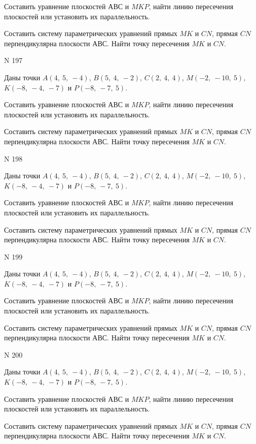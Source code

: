 \documentclass[11pt]{report}
\begin{document}
Составить уравнение плоскостей $АВС$ и $MKP$,
найти линию пересечения плоскостей или установить их параллельность.

Составить систему параметрических уравнений прямых $MK$ и $CN$,
прямая $CN$ перпендикулярна плоскости $АВС$. 
Найти точку пересечения $MK$ и $CN$.



 N 197

Даны точки $A\left( 4, \  5, \  -4\right)$, $B\left( 5, \  4, \  -2\right)$, $C\left( 2, \  4, \  4\right)$, $M\left( -2, \  -10, \  5\right)$, $K\left( -8, \  -4, \  -7\right)$ и $P\left( -8, \  -7, \  5\right)$.


Составить уравнение плоскостей $АВС$ и $MKP$,
найти линию пересечения плоскостей или установить их параллельность.

Составить систему параметрических уравнений прямых $MK$ и $CN$,
прямая $CN$ перпендикулярна плоскости $АВС$. 
Найти точку пересечения $MK$ и $CN$.



 N 198

Даны точки $A\left( 4, \  5, \  -4\right)$, $B\left( 5, \  4, \  -2\right)$, $C\left( 2, \  4, \  4\right)$, $M\left( -2, \  -10, \  5\right)$, $K\left( -8, \  -4, \  -7\right)$ и $P\left( -8, \  -7, \  5\right)$.


Составить уравнение плоскостей $АВС$ и $MKP$,
найти линию пересечения плоскостей или установить их параллельность.

Составить систему параметрических уравнений прямых $MK$ и $CN$,
прямая $CN$ перпендикулярна плоскости $АВС$. 
Найти точку пересечения $MK$ и $CN$.



 N 199

Даны точки $A\left( 4, \  5, \  -4\right)$, $B\left( 5, \  4, \  -2\right)$, $C\left( 2, \  4, \  4\right)$, $M\left( -2, \  -10, \  5\right)$, $K\left( -8, \  -4, \  -7\right)$ и $P\left( -8, \  -7, \  5\right)$.


Составить уравнение плоскостей $АВС$ и $MKP$,
найти линию пересечения плоскостей или установить их параллельность.

Составить систему параметрических уравнений прямых $MK$ и $CN$,
прямая $CN$ перпендикулярна плоскости $АВС$. 
Найти точку пересечения $MK$ и $CN$.



 N 200

Даны точки $A\left( 4, \  5, \  -4\right)$, $B\left( 5, \  4, \  -2\right)$, $C\left( 2, \  4, \  4\right)$, $M\left( -2, \  -10, \  5\right)$, $K\left( -8, \  -4, \  -7\right)$ и $P\left( -8, \  -7, \  5\right)$.


Составить уравнение плоскостей $АВС$ и $MKP$,
найти линию пересечения плоскостей или установить их параллельность.

Составить систему параметрических уравнений прямых $MK$ и $CN$,
прямая $CN$ перпендикулярна плоскости $АВС$. 
Найти точку пересечения $MK$ и $CN$.



\newpage
\end{document}
